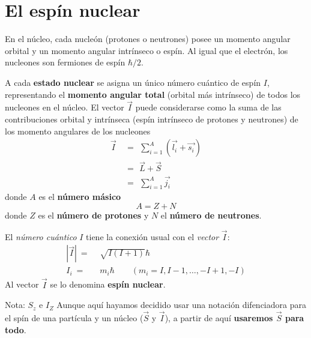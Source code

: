 \documentclass[a4paper,11pt]{book} %
\numberwithin{equation}{chapter}
\begin{document}
		\section{El espín nuclear} \label{sec_sub_Harware_NMR_espin}

En el núcleo, cada nucleón (protones o neutrones) posee un momento angular orbital y un momento angular intrínseco o espín. Al igual que el electrón, los nucleones son fermiones de espín $\hbar/2$. 

A cada \textbf{estado nuclear} se asigna un único número cuántico de espín $I$, representando el \textbf{momento angular total} (orbital más intrínseco) de todos los nucleones en el núcleo. El vector $\vec{I}$ puede considerarse como la suma de las contribuciones orbital y intrínseca (espín intrínseco de protones y neutrones) de los momento angulares de los nucleones
\begin{align} \label{ec_Hardware_NMR_I}
\vec{I} ~ & =  ~ \, \sum_{i=1}^A (\vec{l_i} +  \vec{s_i}) \nonumber \\
& = ~ \,  \vec{L} + \vec{S}  \\
& = ~ \, \sum_{i=1}^A \vec{j_i} \nonumber
\end{align}
donde $A$ es el \textbf{número másico} 
	\begin{equation}
	A = Z + N 
	\end{equation}
donde $Z$ es el \textbf{número de protones} y $N$ el \textbf{número de neutrones}.

El \textit{número cuántico} $I$ tiene la conexión  usual con el \textit{vector} $\vec{I}$:
\begin{align}
| \vec{I} | ~ = & ~\,  \sqrt{I(I+1)} \hbar \\
I_i ~ = & ~\, m_i \hbar \qquad (m_i = I, I-1, \dots, -I +1, -I)
\end{align}
Al vector $\vec{I}$ se lo denomina \textbf{espín nuclear}.

	\begin{mybox_blue}{Nota: $S_z$ e $I_Z$}
	Aunque aquí hayamos decidido usar una notación difenciadora para el spín de una partícula 
	y un núcleo ($\vec{S}$ y $\vec{I}$), a partir de aquí \textbf{usaremos $\vec{S}$ para todo}.
	\end{mybox_blue}
\end{document}

